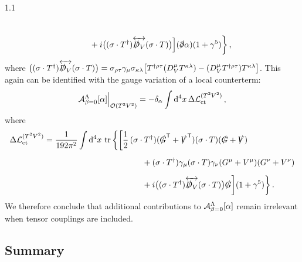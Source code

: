 \documentclass[a4paper,12pt]{article}
\def\L{{\cal L}}
\def\O{{\cal O}}
\def\Acal{{\cal A}}
\def\T{\textsf{T}}
\def\Dsl{\slashed{D}}
\def\Gsl{\slashed{G}}
\def\pdsl{\slashed\partial}
\def\Vsl{\slashed{V}}
\begin{document}
\begin{spacing}{1.1}
\begin{align}
\notag\\[5pt]
&\hspace{30pt}
+i \big( (\sigma\cdot T^\dagger) \overleftrightarrow{\Dsl_V} (\sigma\cdot T) \big)
\Big] (\pdsl \alpha) (1+\gamma^5) \bigg\} \,,
\end{align}\vspace{-1pt}
where $\big( (\sigma\cdot T^\dagger) \overleftrightarrow{\Dsl_V} (\sigma\cdot T) \big) =  \sigma_{\rho\tau} \gamma_\mu \sigma_{\kappa\lambda} \big[  T^{\dagger\rho\tau}  (D_V^\mu T^{\kappa\lambda}) - (D_V^\mu T^{\dagger\rho\tau}) T^{\kappa\lambda} \big]$.
This again can be identified with the gauge variation of a local counterterm:
\begin{equation}
\Acal_{\beta=0}^\Lambda[\alpha]\Bigr|_{\O(T^2V^2)} = -\delta_\alpha \int \dd^4x \,\Delta\L_\text{ct}^{(T^2V^2)} \,,
\end{equation}
where
\begin{align}
\Delta\L_\text{ct}^{(T^2V^2)} &= \frac{1}{192\pi^2} \int \dd^4x\, \tr \bigg\{ \bigg[ 
\frac12\, (\sigma\cdot T^\dagger) (\Gsl^\T + \Vsl^\T ) (\sigma\cdot T) ( \Gsl + \Vsl )
\notag\\[5pt]
&\hspace{120pt}
+ (\sigma\cdot T^\dagger) \gamma_\mu (\sigma\cdot T) \gamma_\nu ( G^\mu + V^\mu ) ( G^\nu + V^\nu )
\notag\\[5pt]
&\hspace{120pt} 
+ i\big( (\sigma\cdot T^\dagger) \overleftrightarrow{\Dsl_V} (\sigma\cdot T) \big) \Gsl
\bigg] (1+\gamma^5) \bigg\} \,.
\label{eq:LctT2V2}
\end{align}
We therefore conclude that additional contributions to $\Acal_{\beta=0}^\Lambda[\alpha]$ remain irrelevant when tensor couplings are included.


\subsection{Summary}
\label{subsec:Summary}


\end{spacing}
\end{document}
